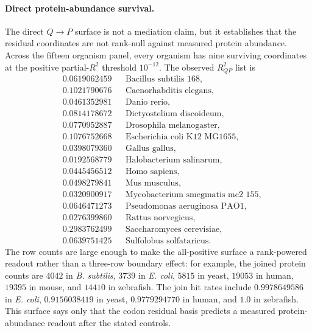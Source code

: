 \paragraph{Direct protein-abundance survival.}
The direct $Q\to P$ surface is not a mediation claim, but it establishes that the residual coordinates are not rank-null against measured protein abundance.  Across the fifteen organism panel, every organism has nine surviving coordinates at the positive partial-$R^{2}$ threshold $10^{-12}$.  The observed $R^{2}_{QP}$ list is
$$
\begin{aligned}
&0.0619062459 &&\text{Bacillus subtilis 168},\\
&0.1021790676 &&\text{Caenorhabditis elegans},\\
&0.0461352981 &&\text{Danio rerio},\\
&0.0814178672 &&\text{Dictyostelium discoideum},\\
&0.0770952887 &&\text{Drosophila melanogaster},\\
&0.1076752668 &&\text{Escherichia coli K12 MG1655},\\
&0.0398079360 &&\text{Gallus gallus},\\
&0.0192568779 &&\text{Halobacterium salinarum},\\
&0.0445456512 &&\text{Homo sapiens},\\
&0.0498279841 &&\text{Mus musculus},\\
&0.0320900917 &&\text{Mycobacterium smegmatis mc2 155},\\
&0.0646471273 &&\text{Pseudomonas aeruginosa PAO1},\\
&0.0276399860 &&\text{Rattus norvegicus},\\
&0.2983762499 &&\text{Saccharomyces cerevisiae},\\
&0.0639751425 &&\text{Sulfolobus solfataricus}.
\end{aligned}
$$
The row counts are large enough to make the all-positive surface a rank-powered readout rather than a three-row boundary effect: for example, the joined protein counts are $4042$ in \textit{B. subtilis}, $3739$ in \textit{E. coli}, $5815$ in yeast, $19053$ in human, $19395$ in mouse, and $14410$ in zebrafish.  The join hit rates include $0.9978649586$ in \textit{E. coli}, $0.9156038419$ in yeast, $0.9779294770$ in human, and $1.0$ in zebrafish.  This surface says only that the codon residual basis predicts a measured protein-abundance readout after the stated controls.

